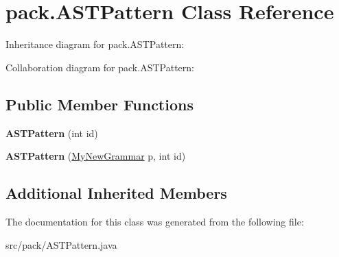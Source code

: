 \hypertarget{classpack_1_1_a_s_t_pattern}{}\section{pack.\+A\+S\+T\+Pattern Class Reference}
\label{classpack_1_1_a_s_t_pattern}


Inheritance diagram for pack.\+A\+S\+T\+Pattern\+:


Collaboration diagram for pack.\+A\+S\+T\+Pattern\+:
\subsection*{Public Member Functions}
\begin{DoxyCompactItemize}
\item 
{\bfseries A\+S\+T\+Pattern} (int id)\hypertarget{classpack_1_1_a_s_t_pattern_a5d2eb43d733097b16ed67ea919a3fe0b}{}\label{classpack_1_1_a_s_t_pattern_a5d2eb43d733097b16ed67ea919a3fe0b}

\item 
{\bfseries A\+S\+T\+Pattern} (\hyperlink{classpack_1_1_my_new_grammar}{My\+New\+Grammar} p, int id)\hypertarget{classpack_1_1_a_s_t_pattern_a1f5d1c1003b6b61d7164b0e4d7bd593e}{}\label{classpack_1_1_a_s_t_pattern_a1f5d1c1003b6b61d7164b0e4d7bd593e}

\end{DoxyCompactItemize}
\subsection*{Additional Inherited Members}


The documentation for this class was generated from the following file\+:\begin{DoxyCompactItemize}
\item 
src/pack/A\+S\+T\+Pattern.\+java\end{DoxyCompactItemize}
